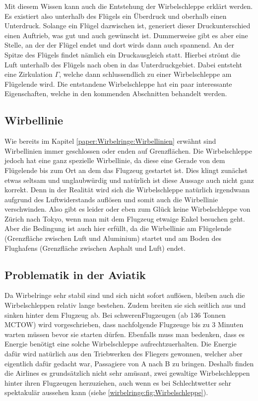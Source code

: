 Mit diesem Wissen kann auch die Entstehung der Wirbelschleppe erklärt werden. 
Es existiert also unterhalb des Flügels ein Überdruck und oberhalb einen Unterdruck.
Solange ein Flügel dazwischen ist, generiert dieser Druckunterschied einen Auftrieb, was gut und auch gewünscht ist.
Dummerweise gibt es aber eine Stelle, an der der Flügel endet und dort wirds dann auch spannend.
An der Spitze des Flügels findet nämlich ein Druckausgleich statt.
Hierbei strömt die Luft unterhalb des Flügels nach oben in das Unterdruckgebiet. 
Dabei entsteht eine Zirkulation $\Gamma$, welche dann schlussendlich zu einer Wirbelschleppe am Flügelende wird.
Die entstandene Wirbelschleppe hat ein paar interessante Eigenschaften, welche in den kommenden Abschnitten behandelt werden.

\subsection{Wirbellinie}
Wie bereits im Kapitel \ref{paper:Wirbelringe:Wirbellinien} erwähnt sind Wirbellinien immer geschlossen oder enden auf Grenzflächen.
Die Wirbelschleppe jedoch hat eine ganz spezielle Wirbellinie, da diese eine Gerade von dem Flügelende bis zum Ort an dem das Flugzeug gestartet ist.
Dies klingt zunächst etwas seltsam und unglaubwürdig und natürlich ist diese Aussage auch nicht ganz korrekt.
Denn in der Realität wird sich die Wirbelschleppe natürlich irgendwann aufgrund des Luftwiderstands auflösen und somit auch die Wirbellinie verschwinden.
Also gibt es leider oder eben zum Glück keine Wirbelschleppe von Zürich nach Tokyo, wenn man mit dem Flugzeug etwaige Enkel besuchen geht.
Aber die Bedingung ist auch hier erfüllt, da die Wirbellinie am Flügelende (Grenzfläche zwischen Luft und Aluminium) startet und am Boden des Flughafens (Grenzfläche zwischen Asphalt und Luft) endet.

\subsection{Problematik in der Aviatik}
Da Wirbelringe sehr stabil sind und sich nicht sofort auflösen, bleiben auch die Wirbelschleppen relativ lange bestehen.
Zudem breiten sie sich seitlich aus und sinken hinter dem Flugzeug ab.
Bei \glqq schweren\grqq Flugzeugen (ab 136 Tonnen MCTOW) \cite{Wirbelringe:WakeTurbulence} wird vorgeschrieben, dass nachfolgende Flugzeuge bis zu 3 Minuten warten müssen bevor sie starten dürfen.
Ebenfalls muss man bedenken, dass es Energie benötigt eine solche Wirbelschleppe aufrechtzuerhalten.
Die Energie dafür wird natürlich aus den Triebwerken des Fliegers gewonnen, welcher aber eigentlich dafür gedacht war, Passagiere von A nach B zu bringen.
Deshalb finden die Airlines es grundsätzlich nicht sehr amüsant, zwei gewaltige Wirbelschleppen hinter ihren Flugzeugen herzuziehen, auch wenn es bei Schlechtwetter sehr spektakulär aussehen kann (siehe \ref{wirbelringe:fig:Wirbelschleppe}). %